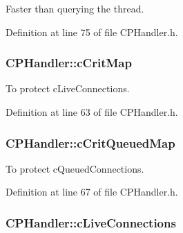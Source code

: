 \-Faster than querying the thread. 



\-Definition at line 75 of file \-C\-P\-Handler.\-h.

\hypertarget{class_c_p_handler_a58ba2190209441a5fd44cd4bd1605d79}{
\subsubsection[{c\-Crit\-Map}]{ {\bf \-C\-P\-Handler\-::c\-Crit\-Map}}}\label{class_c_p_handler_a58ba2190209441a5fd44cd4bd1605d79}


\-To protect c\-Live\-Connections. 



\-Definition at line 63 of file \-C\-P\-Handler.\-h.

\hypertarget{class_c_p_handler_a7ffaac647fdd73d143c342bbb88cd379}{
\subsubsection[{c\-Crit\-Queued\-Map}]{ {\bf \-C\-P\-Handler\-::c\-Crit\-Queued\-Map}}}\label{class_c_p_handler_a7ffaac647fdd73d143c342bbb88cd379}


\-To protect c\-Queued\-Connections. 



\-Definition at line 67 of file \-C\-P\-Handler.\-h.

\hypertarget{class_c_p_handler_a7ca8fa5c60e6aad56b2b1a2cac68a2e2}{
\subsubsection[{c\-Live\-Connections}]{ {\bf \-C\-P\-Handler\-::c\-Live\-Connections}}}\label{class_c_p_handler_a7ca8fa5c60e6aad56b2b1a2cac68a2e2}


